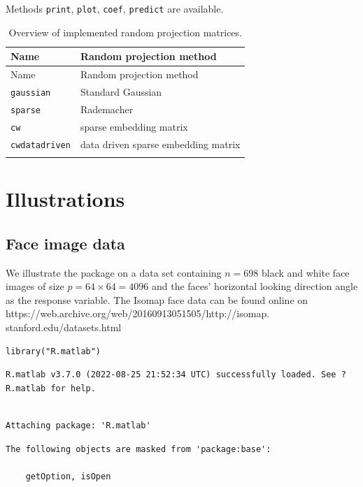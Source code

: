 \documentclass[
  article]{jss}
\begin{document}
Methods \texttt{print}, \texttt{plot}, \texttt{coef}, \texttt{predict}
are available.

\begin{longtable}[]{@{}ll@{}}
\toprule\noalign{}
Name & Random projection method \\
\midrule\noalign{}
\endfirsthead
\toprule\noalign{}
Name & Random projection method \\
\midrule\noalign{}
\endhead
\bottomrule\noalign{}
\endlastfoot
\texttt{gaussian} & Standard Gaussian \\
\texttt{sparse} & Rademacher \\
\texttt{cw} & sparse embedding matrix \\
\texttt{cwdatadriven} & data driven sparse embedding matrix \\
\caption{Overview of implemented random projection
matrices.}\label{tbl-overviewrp}\tabularnewline
\end{longtable}

\section{Illustrations}\label{sec-illustrations}

\subsection{Face image data}\label{face-image-data}

We illustrate the package on a data set containing \(n = 698\) black and
white face images of size \(p = 64 \times 64 = 4096\) and the faces'
horizontal looking direction angle as the response variable. The Isomap
face data can be found online on
https://web.archive.org/web/20160913051505/http://isomap.
stanford.edu/datasets.html

\begin{verbatim}
library("R.matlab")
\end{verbatim}

\begin{verbatim}
R.matlab v3.7.0 (2022-08-25 21:52:34 UTC) successfully loaded. See ?R.matlab for help.
\end{verbatim}

\begin{verbatim}

Attaching package: 'R.matlab'
\end{verbatim}

\begin{verbatim}
The following objects are masked from 'package:base':

    getOption, isOpen
\end{verbatim}
\end{document}
